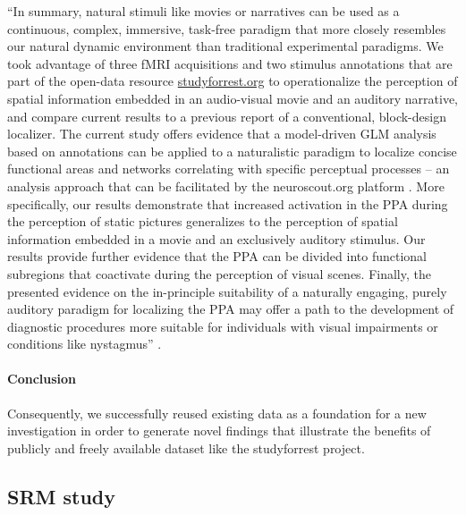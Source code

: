 ``In summary, natural stimuli like movies \citep{eickhoff2020towards,
hasson2008neurocinematics, sonkusare2019naturalistic} or narratives
\citep{hamilton2018revolution, honey2012not, lerner2011topographic,
silbert2014coupled, wilson2008beyond} can be used as a continuous, complex,
immersive, task-free paradigm that more closely resembles our natural dynamic
environment than traditional experimental paradigms.
We took advantage of three fMRI acquisitions and two stimulus annotations that
are part of the open-data resource
\href{http://www.studyforrest.org}{studyforrest.org} to operationalize the
perception of spatial information embedded in an audio-visual movie and an
auditory narrative, and compare current results to a previous report of a
conventional, block-design localizer.
The current study offers evidence that a model-driven GLM analysis based on
annotations can be applied to a naturalistic paradigm to localize concise
functional areas and networks correlating with specific perceptual processes --
an analysis approach that can be facilitated by the neuroscout.org platform
\citep{delavega2021neuroscout}.
More specifically, our results demonstrate that increased activation in the PPA
during the perception of static pictures generalizes to the perception of
spatial information embedded in a movie and an exclusively auditory stimulus.
Our results provide further evidence that the PPA can be divided into functional
subregions that coactivate during the perception of visual scenes.
Finally, the presented evidence on the in-principle suitability of a naturally
engaging, purely auditory paradigm for localizing the PPA may offer a path to
the development of diagnostic procedures more suitable for individuals with
visual impairments or conditions like nystagmus'' \citep{haeusler2022processing}.


\paragraph{Conclusion}


%
Consequently, we successfully reused existing data as a foundation for a new
investigation in order to generate novel findings that illustrate the benefits
of publicly and freely available dataset like the studyforrest project.


\subsection{SRM study}

